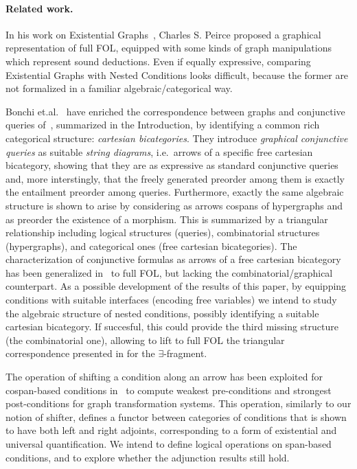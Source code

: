 
\paragraph{Related work.}

In his work on Existential Graphs~\cite{roberts1973-the-existential-graphs-of-charles-s.-peirce}, Charles S. Peirce proposed a graphical representation of full FOL, equipped with some kinds of graph manipulations which represent sound deductions. Even if equally expressive, comparing Existential Graphs with Nested Conditions looks difficult, because the former are not formalized in a familiar algebraic/categorical way.

Bonchi et.al.~\cite{DBLP:conf/csl/BonchiSS18} have enriched the correspondence between graphs and conjunctive queries of~\cite{DBLP:conf/stoc/ChandraM77}, summarized in the Introduction,  by identifying a common rich categorical structure: \emph{cartesian bicategories}. They introduce \emph{graphical conjunctive queries} as suitable \emph{string diagrams}, i.e.~arrows of a specific free cartesian bicategory, showing that they are as expressive as standard conjunctive queries and, more interstingly, that the freely generated preorder among them is exactly the entailment preorder among queries. Furthermore, exactly the same algebraic structure is shown to arise by considering as arrows cospans of hypergraphs and as preorder the existence of a morphism. This is summarized by a triangular relationship including logical structures (queries), combinatorial structures (hypergraphs), and categorical ones (free cartesian bicategories).  The characterization of conjunctive formulas as arrows of a free cartesian bicategory has been generalized in~\cite{DBLP:journals/corr/abs-2404-18795} to full FOL, but lacking the combinatorial/graphical counterpart. As a possible development of the results of this paper, by equipping conditions with suitable interfaces (encoding free variables) we intend to study the algebraic structure of nested conditions, possibly identifying a suitable cartesian bicategory. If succesful, this could provide the third missing structure (the combinatorial one), allowing to lift to full FOL the triangular correspondence presented in \cite{DBLP:conf/csl/BonchiSS18} for the $\exists$-fragment.


The operation of shifting a condition along an arrow has been exploited for cospan-based conditions in~\cite{bchk:conditional-reactive-systems} to compute weakest pre-conditions and strongest post-conditions for graph transformation systems. This operation, similarly to our notion of shifter, defines a functor between categories of conditions that is shown to have both left and right adjoints, corresponding to a form of existential and universal quantification.  We intend to define logical operations on span-based conditions, and to explore whether the adjunction results still hold.

